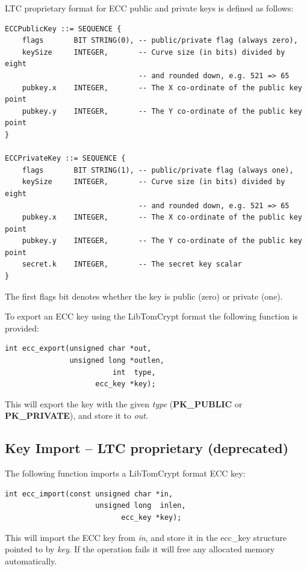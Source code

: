 \documentclass[synpaper]{book}
\begin{document}
LTC proprietary format for ECC public and private keys is defined as follows:

\begin{small}
\begin{verbatim}
ECCPublicKey ::= SEQUENCE {
    flags       BIT STRING(0), -- public/private flag (always zero),
    keySize     INTEGER,       -- Curve size (in bits) divided by eight
                               -- and rounded down, e.g. 521 => 65
    pubkey.x    INTEGER,       -- The X co-ordinate of the public key point
    pubkey.y    INTEGER,       -- The Y co-ordinate of the public key point
}

ECCPrivateKey ::= SEQUENCE {
    flags       BIT STRING(1), -- public/private flag (always one),
    keySize     INTEGER,       -- Curve size (in bits) divided by eight
                               -- and rounded down, e.g. 521 => 65
    pubkey.x    INTEGER,       -- The X co-ordinate of the public key point
    pubkey.y    INTEGER,       -- The Y co-ordinate of the public key point
    secret.k    INTEGER,       -- The secret key scalar
}
\end{verbatim}
\end{small}

The first flags bit denotes whether the key is public (zero) or private (one).

To export an ECC key using the LibTomCrypt format the following function is provided:
\begin{verbatim}
int ecc_export(unsigned char *out,
               unsigned long *outlen,
                         int  type,
                     ecc_key *key);
\end{verbatim}
This will export the key with the given \textit{type} (\textbf{PK\_PUBLIC} or \textbf{PK\_PRIVATE}), and store it to \textit{out}.

\subsection{Key Import -- LTC proprietary (deprecated)}

The following function imports a LibTomCrypt format ECC key:
\begin{verbatim}
int ecc_import(const unsigned char *in,
                     unsigned long  inlen,
                           ecc_key *key);
\end{verbatim}
This will import the ECC key from \textit{in}, and store it in the ecc\_key structure pointed to by \textit{key}.  If the operation fails it will free
any allocated memory automatically.
\end{document}
